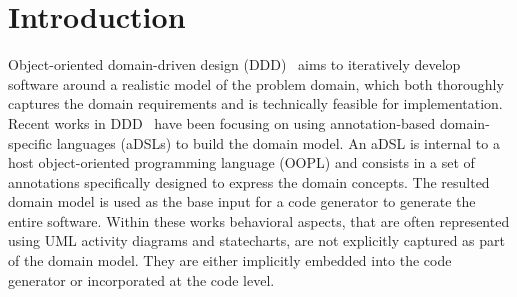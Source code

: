 %
\section{Introduction}\label{sect:introduction}
Object-oriented domain-driven design (DDD)~\cite{evans_domain-driven_2004} aims to iteratively develop software around a realistic model of the problem domain, which both thoroughly captures the domain requirements and is technically feasible for implementation.
%
Recent works in DDD~\cite{dan_haywood_apache_2013, paniza_learn_2011} have been focusing on using annotation-based domain-specific languages (aDSLs) to build the domain model. An aDSL is internal to a host object-oriented programming language (OOPL) and consists in a set of annotations specifically designed to express the domain concepts. The resulted domain model is used as the base input for a code generator to generate the entire software. 
%
%
Within these works behavioral aspects, that are often represented using UML activity diagrams and statecharts, are not explicitly captured as part of the domain model. They are either implicitly embedded into the code generator or incorporated at the code level. 



